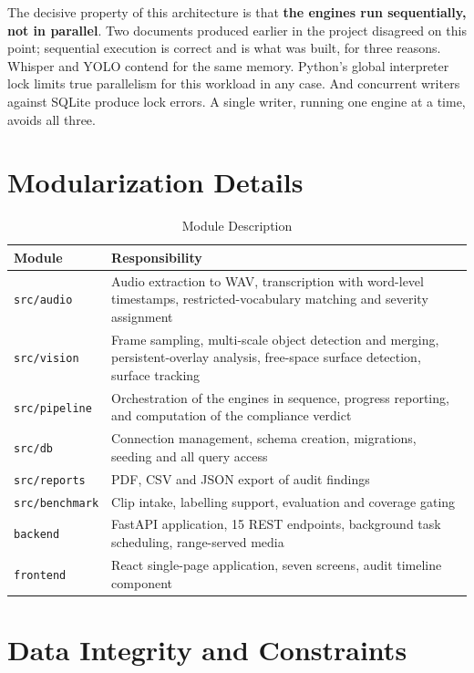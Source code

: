 \documentclass[
12pt,
a4paper,
oneside
]{report}
\begin{document}
The decisive property of this architecture is that \textbf{the engines run
sequentially, not in parallel}. Two documents produced earlier in the project
disagreed on this point; sequential execution is correct and is what was built,
for three reasons. Whisper and YOLO contend for the same memory. Python's global
interpreter lock limits true parallelism for this workload in any case. And
concurrent writers against SQLite produce lock errors. A single writer, running
one engine at a time, avoids all three.

\section{Modularization Details}

\begin{table}[H]
\centering
\begin{tabular}{|p{4cm}|p{9cm}|}
\hline
\textbf{Module} & \textbf{Responsibility} \\
\hline
\texttt{src/audio} & Audio extraction to WAV, transcription with word-level
timestamps, restricted-vocabulary matching and severity assignment \\
\hline
\texttt{src/vision} & Frame sampling, multi-scale object detection and merging,
persistent-overlay analysis, free-space surface detection, surface tracking \\
\hline
\texttt{src/pipeline} & Orchestration of the engines in sequence, progress
reporting, and computation of the compliance verdict \\
\hline
\texttt{src/db} & Connection management, schema creation, migrations, seeding
and all query access \\
\hline
\texttt{src/reports} & PDF, CSV and JSON export of audit findings \\
\hline
\texttt{src/benchmark} & Clip intake, labelling support, evaluation and coverage
gating \\
\hline
\texttt{backend} & FastAPI application, 15 REST endpoints, background task
scheduling, range-served media \\
\hline
\texttt{frontend} & React single-page application, seven screens, audit timeline
component \\
\hline
\end{tabular}
\caption{Module Description}
\end{table}

\section{Data Integrity and Constraints}
\end{document}
